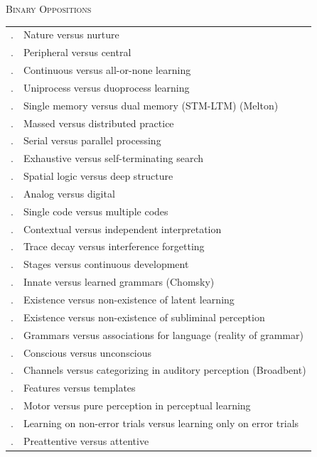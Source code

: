 \documentclass{paper}
\newcounter{magicrownumbers}[figure]
\newcommand\rownumber{\stepcounter{magicrownumbers}\arabic{magicrownumbers}.}
\begin{document}
\begin{table}[!b]
\begin{center}
\textsc{Binary Oppositions}\\
\vspace{2ex}

\footnotesize
\begin{tabular}{l l}
\rownumber & Nature versus nurture \\
\rownumber & Peripheral versus central \\
\rownumber & Continuous versus all-or-none learning \\ 
\rownumber & Uniprocess versus duoprocess learning \\
\rownumber & Single memory versus dual memory (STM-LTM) (Melton) \\
\rownumber & Massed versus distributed practice \\
\rownumber & Serial versus parallel processing \\
\rownumber & Exhaustive versus self-terminating search \\
\rownumber & Spatial logic versus deep structure \\
\rownumber & Analog versus digital \\
\rownumber & Single code versus multiple codes \\
\rownumber & Contextual versus independent interpretation \\
\rownumber & Trace decay versus interference forgetting \\
\rownumber & Stages versus continuous development \\
\rownumber & Innate versus learned grammars (Chomsky) \\
\rownumber & Existence versus non-existence of latent learning \\
\rownumber & Existence versus non-existence of subliminal perception \\
\rownumber & Grammars versus associations for language (reality of grammar) \\
\rownumber & Conscious versus unconscious \\
\rownumber & Channels versus categorizing in auditory perception (Broadbent) \\
\rownumber & Features versus templates \\
\rownumber & Motor versus pure perception in perceptual learning \\
\rownumber & Learning on non-error trials versus learning only on error trials \\
\rownumber & Preattentive versus attentive \\
\end{tabular}
\end{center}
\label{oppofig}
\end{table}
\end{document}
